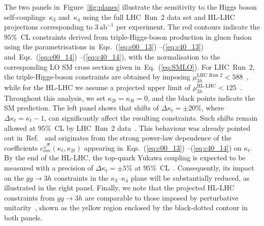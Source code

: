 \documentclass{SciPost}
\providecommand{\DIFaddtex}[1]{{\protect\color{red} #1}} %
\providecommand{\DIFdeltex}[1]{} %
\providecommand{\DIFaddbegin}{} %
\providecommand{\DIFaddend}{} %
\providecommand{\DIFdelbegin}{} %
\providecommand{\DIFdelend}{} %
\providecommand{\DIFadd}[1]{\texorpdfstring{\DIFaddtex{#1}}{#1}} %
\providecommand{\DIFdel}[1]{\texorpdfstring{\DIFdeltex{#1}}{}} %
\begin{document}
The two panels in~Figure~\ref{fig:planes} illustrate the \DIFdelbegin \DIFdel{expected }\DIFdelend sensitivity to the Higgs \DIFaddbegin \DIFadd{boson }\DIFaddend self-couplings~$\kappa_3$ and~$\kappa_4$ using \DIFdelbegin \DIFdel{current }\DIFdelend \DIFaddbegin \DIFadd{the full }\DIFaddend LHC~Run~2 data \DIFaddbegin \DIFadd{set }\DIFaddend and HL-LHC projections \DIFdelbegin \DIFdel{, assuming an integrated luminosity of }\DIFdelend \DIFaddbegin \DIFadd{corresponding to }\DIFaddend $3\,\mathrm{ab}^{-1}$ \DIFaddbegin \DIFadd{per experiment}\DIFaddend . The red contours indicate the $95\%$~CL constraints derived from \DIFdelbegin \DIFdel{triple-Higgs }\DIFdelend \DIFaddbegin \DIFadd{triple-Higgs-boson }\DIFaddend production in gluon fusion using the \DIFdelbegin \DIFdel{parameterisations }\DIFdelend \DIFaddbegin \DIFadd{parametrisations }\DIFaddend in~Eqs.~(\ref{eq:c00_13})\DIFdelbegin \DIFdel{to~}\DIFdelend \DIFaddbegin \DIFadd{--}\DIFaddend (\ref{eq:c40_13}) and~Eqs.~(\ref{eq:c00_14})\DIFdelbegin \DIFdel{to~}\DIFdelend \DIFaddbegin \DIFadd{--}\DIFaddend (\ref{eq:c40_14}), with the normalisation to the corresponding LO SM cross section given in~Eq.~(\ref{eq:SMLO}). For LHC~Run~2, the \DIFdelbegin \DIFdel{triple-Higgs }\DIFdelend \DIFaddbegin \DIFadd{triple-Higgs-boson }\DIFaddend constraints are obtained by imposing $\mu_{3h}^{\text{LHC~Run~2}} < 588$~\cite{CMS-PAS-HIG-24-012}, while for the HL-LHC we assume a projected upper limit of $\mu_{3h}^{\text{HL-LHC}} < 125$~\cite{ATL-PHYS-PUB-2025-003}. Throughout this analysis, we set \DIFdelbegin \DIFdel{$\kappa_{2t}=0$}\DIFdelend \DIFaddbegin \DIFadd{$\kappa_{2t}=\kappa_{3t}=0$}\DIFaddend , and the black \DIFdelbegin \DIFdel{dots }\DIFdelend \DIFaddbegin \DIFadd{points }\DIFaddend indicate the SM prediction. \DIFdelbegin \DIFdel{The left panel demonstrates that modifications of the top-quark Yukawa coupling of $\Delta\kappa_t=\pm20\%$, where $\Delta\kappa_t=\kappa_t-1$, which remain allowed at the $95\%$~CL after LHC~Run~2~\cite{ATLAS:2022vkf,CMS:2022dwd}, have a significant impact on the resulting constraints.}\DIFdelend \DIFaddbegin \DIFadd{The left panel shows that shifts of $\Delta\kappa_t=\pm20\%$, where $\Delta\kappa_t=\kappa_t-1$, can significantly affect the resulting constraints. Such shifts remain allowed at $95\%$~CL by LHC~Run~2 data~\cite{ATLAS:2022vkf,CMS:2022dwd}.}\DIFaddend{} This behaviour was already pointed out in~Ref.~\cite{Panizzi:2025sya} and originates from the strong power-law dependence of the coefficients $c_{nm}^{\sqrt{s}}\!\left(\kappa_t,\kappa_{2t}\right)$ appearing in~Eqs.~(\ref{eq:c00_13})\DIFdelbegin \DIFdel{to~}\DIFdelend \DIFaddbegin \DIFadd{--}\DIFaddend (\ref{eq:c40_14}) on $\kappa_t$. By the end of the HL-LHC, the top-quark Yukawa coupling is expected to be measured with a precision of $\Delta\kappa_t=\pm5\%$ at \DIFdelbegin \DIFdel{the }\DIFdelend $95\%$~CL~\cite{ATL-PHYS-PUB-2025-018}. Consequently, its impact on the $gg\to3h$ constraints in the $\kappa_3$--$\kappa_4$ plane will be substantially reduced, as illustrated in the right panel. Finally, we note that the projected HL-LHC constraints from $gg\to3h$ are comparable to those imposed by perturbative unitarity~\cite{Liu:2018peg,Stylianou:2023xit,DiLuzio:2017tfn}, shown as the yellow region enclosed by the black-dotted contour in both panels.
\end{document}
